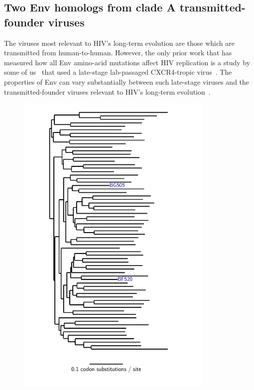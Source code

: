 \documentclass[9pt]{elife}
\begin{document}
\subsection{Two Env homologs from clade A transmitted-founder viruses}
The viruses most relevant to HIV's long-term evolution are those which are transmitted from human-to-human.
However, the only prior work that has measured how all Env amino-acid mutations affect HIV replication is a study by some of us~\citep{haddox2016experimental} that used a late-stage lab-passaged CXCR4-tropic virus~\citep[LAI;][]{peden1991changes}.
The properties of Env can vary substantially between such late-stage viruses and the transmitted-founder viruses relevant to HIV's long-term evolution~\citep{sagar2006human,wilen2011phenotypic,parrish2013phenotypic}.

\begin{figure}
\centerline{\includegraphics[clip=true, trim= 0in 0in 1in 0in, angle=-90, width=0.85\textwidth]{figures/tree_plot.pdf}}

\end{figure}
\end{document}

